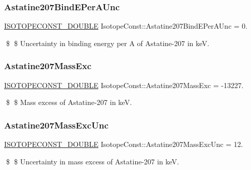 \subsubsection{\texorpdfstring{Astatine207\+Bind\+E\+Per\+A\+Unc}{Astatine207BindEPerAUnc}}
{\footnotesize\ttfamily \mbox{\hyperlink{group___isotope_const-_macros_ga8f45a7272ce02c0b4c65c44636ed719a}{I\+S\+O\+T\+O\+P\+E\+C\+O\+N\+S\+T\+\_\+\+D\+O\+U\+B\+LE}} Isotope\+Const\+::\+Astatine207\+Bind\+E\+Per\+A\+Unc = 0.}

\$ \$ Uncertainty in binding energy per A of Astatine-\/207 in keV. \mbox{\label{group___isotope_const-_astatine-_at207_gaaad7fc1f30070ec9756a8bc156edf818}} 
\subsubsection{\texorpdfstring{Astatine207\+Mass\+Exc}{Astatine207MassExc}}
{\footnotesize\ttfamily \mbox{\hyperlink{group___isotope_const-_macros_ga8f45a7272ce02c0b4c65c44636ed719a}{I\+S\+O\+T\+O\+P\+E\+C\+O\+N\+S\+T\+\_\+\+D\+O\+U\+B\+LE}} Isotope\+Const\+::\+Astatine207\+Mass\+Exc = -\/13227.}

\$ \$ Mass excess of Astatine-\/207 in keV. \mbox{\label{group___isotope_const-_astatine-_at207_ga01c4abb96b9c1ae15447992e5ff4001f}} 
\subsubsection{\texorpdfstring{Astatine207\+Mass\+Exc\+Unc}{Astatine207MassExcUnc}}
{\footnotesize\ttfamily \mbox{\hyperlink{group___isotope_const-_macros_ga8f45a7272ce02c0b4c65c44636ed719a}{I\+S\+O\+T\+O\+P\+E\+C\+O\+N\+S\+T\+\_\+\+D\+O\+U\+B\+LE}} Isotope\+Const\+::\+Astatine207\+Mass\+Exc\+Unc = 12.}

\$ \$ Uncertainty in mass excess of Astatine-\/207 in keV. \mbox{\label{group___isotope_const-_astatine-_at207_ga2da58ea1ac2d108d9b0c643c560f7069}} 
